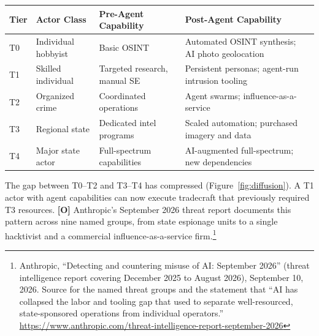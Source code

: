 \documentclass[11pt,letterpaper]{article}
\begin{document}
\begin{center}
\small
\begin{tabularx}{\linewidth}{ZY{0.31}Y{0.92}Y{1.11}Y{1.66}}
\toprule
\textbf{Tier} & \textbf{Actor Class} & \textbf{Pre-Agent Capability} & \textbf{Post-Agent Capability} \\
\midrule
T0 & Individual hobbyist & Basic OSINT & Automated OSINT synthesis; AI photo geolocation \\
T1 & Skilled individual & Targeted research, manual SE & Persistent personas; agent-run intrusion tooling \\
T2 & Organized crime & Coordinated operations & Agent swarms; influence-as-a-service \\
T3 & Regional state & Dedicated intel programs & Scaled automation; purchased imagery and data \\
T4 & Major state actor & Full-spectrum capabilities & AI-augmented full-spectrum; new dependencies \\
\bottomrule
\end{tabularx}
\end{center}

\begin{keybox}
The gap between T0--T2 and T3--T4 has compressed (Figure~\ref{fig:diffusion}). A T1 actor with agent capabilities can now execute tradecraft that previously required T3 resources. \textbf{[O]} Anthropic's September 2026 threat report documents this pattern across nine named groups, from state espionage units to a single hacktivist and a commercial influence-as-a-service firm.\footnote{Anthropic, ``Detecting and countering misuse of AI: September 2026'' (threat intelligence report covering December 2025 to August 2026), September 10, 2026. Source for the named threat groups and the statement that ``AI has collapsed the labor and tooling gap that used to separate well-resourced, state-sponsored operations from individual operators.'' \url{https://www.anthropic.com/threat-intelligence-report-september-2026}}
\end{keybox}
\end{document}
